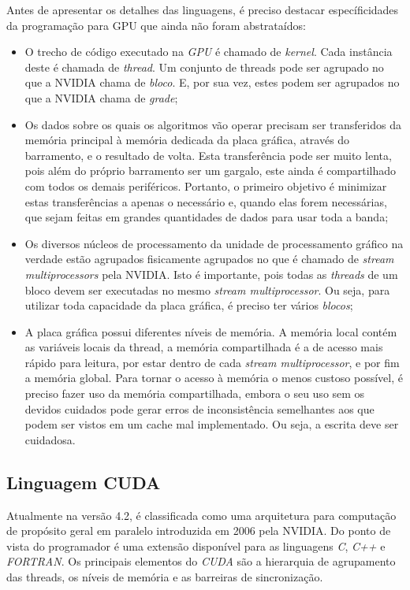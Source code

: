 Antes de apresentar os detalhes das linguagens, é preciso destacar específicidades da programação para GPU que ainda não foram abstrataídos:

\begin{itemize}
  \item O trecho de código executado na \textit{GPU} é chamado de \textit{kernel}. Cada instância deste é chamada de \textit{thread}. Um conjunto de threads pode ser agrupado no que a NVIDIA chama de \textit{bloco}. E, por sua vez, estes podem ser agrupados no que a NVIDIA chama de \textit{grade};
  \item Os dados sobre os quais os algoritmos vão operar precisam ser transferidos da memória principal à memória dedicada da placa gráfica, através do barramento, e o resultado de volta. Esta transferência pode ser muito lenta, pois além do próprio barramento ser um gargalo, este ainda é compartilhado com todos os demais periféricos. Portanto, o primeiro objetivo é minimizar estas transferências a apenas o necessário e, quando elas forem necessárias, que sejam feitas em grandes quantidades de dados para usar toda a banda;
  \item Os diversos núcleos de processamento da unidade de processamento gráfico na verdade estão agrupados fisicamente agrupados no que é chamado de \textit{stream multiprocessors} pela NVIDIA. Isto é importante, pois todas as \textit{threads} de um bloco devem ser executadas no mesmo \textit{stream multiprocessor}. Ou seja, para utilizar toda capacidade da placa gráfica, é preciso ter vários \textit{blocos};
  \item A placa gráfica possui diferentes níveis de memória. A memória local contém as variáveis locais da thread, a memória compartilhada é a de acesso mais rápido para leitura, por estar dentro de cada \textit{stream multiprocessor}, e por fim a memória global. Para tornar o acesso à memória o menos custoso possível, é preciso fazer uso da memória compartilhada, embora o seu uso sem os devidos cuidados pode gerar erros de inconsistência semelhantes aos que podem ser vistos em um cache mal implementado. Ou seja, a escrita deve ser cuidadosa.
\end{itemize}
  \subsection{Linguagem CUDA}
  Atualmente na versão 4.2, é classificada como uma arquitetura para computação de propósito geral em paralelo introduzida em 2006 pela NVIDIA. Do ponto de vista do programador é uma extensão disponível para as linguagens \textit{C}, \textit{C++} e \textit{FORTRAN}. Os principais elementos do \textit{CUDA} são a hierarquia de agrupamento das threads, os níveis de memória e as barreiras de sincronização.
  
